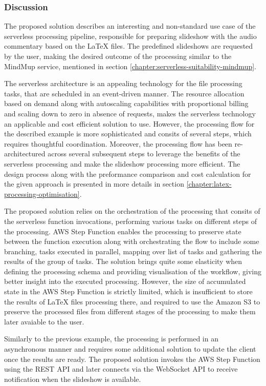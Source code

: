 \subsubsection{Discussion}

The proposed solution describes an interesting and non-standard use case of the serverless processing pipeline, responsible for preparing slideshow with the audio commentary based on the LaTeX files.
The predefined slideshows are requested by the user, making the desired outcome of the processing similar to the MindMup service, mentioned in section \ref{chapter:serverless-suitability-mindmup}.

The serverless architecture is an appealing technology for the file processing tasks, that are scheduled in an event-driven manner. 
The resource allocation based on demand along with autoscaling capabilities with proportional billing and scaling down to zero in absence of requests, makes the serverless technology an applicable and cost efficient solution to use.
However, the processing flow for the described example is more sophisticated and consits of several steps, which requires thoughtful coordination.
Moreover, the processing flow has been re-architectured across several subsequent steps to leverage the benefits of the serverless processing and make the slideshow processing more efficient.
The design process along with the preformance comparison and cost calculation for the given approach is presented in more details in section \ref{chapter:latex-processing-optimisation}.

The proposed solution relies on the orchestration of the processing that consits of the serverless function invocations, performing various tasks on different steps of the processing. 
AWS Step Function enables the processing to preserve state between the function execution along with orchestrating the flow to include some branching, tasks executed in parallel, mapping over list of tasks and gathering the results of the group of tasks.
The solution brings quite some elasticity when defining the processing schema and providing visualisation of the workflow, giving better insight into the executed processing.
However, the size of accumulated state in the AWS Step Function is strictly limited, which is insufficient to store the results of LaTeX files processing there, and required to use the Amazon S3 to preserve the processed files from different stages of the processing to make them later avaiable to the user.

Similarly to the previous example, the processing is performed in an asynchronous manner and requires some additional solution to update the client once the results are ready. The proposed solution invokes the AWS Step Function using the REST API and later connects via the WebSocket API to receive notification when the slideshow is available. 

